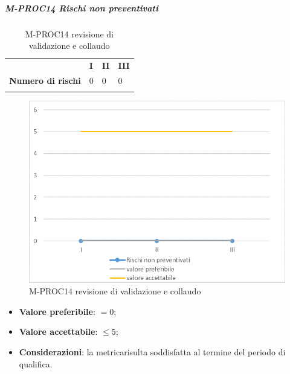 \subparagraph{M-PROC14 Rischi non preventivati} \mbox{}
\begin{longtable}[H!] {						
		>{}p{50mm}  		
		>{}p{8mm}
		>{}p{8mm}		
		>{}p{8mm}		
	}
	\rowcolor{gray!50}
	\textbf{} & \textbf{I} & \textbf{II} & \textbf{III}  \TBstrut \\ [2mm]
	\textbf{Numero di rischi} & 0 & 0 & 0  \TBstrut \\ [2mm]
	\rowcolor{white}
	\caption{M-PROC14 revisione di validazione e collaudo}
\end{longtable}
\begin{figure}[H] 	
	\includegraphics[width=\linewidth]{./img/grafici/RA14.png}	
	\caption{M-PROC14 revisione di validazione e collaudo}	
\end{figure}
\begin{itemize}
	\item \textbf{Valore preferibile}: $=0$;
	\item \textbf{Valore accettabile}: $\le 5$;
	\item \textbf{Considerazioni}: la metrica\glosp risulta soddisfatta al termine del periodo di qualifica.
\end{itemize}

